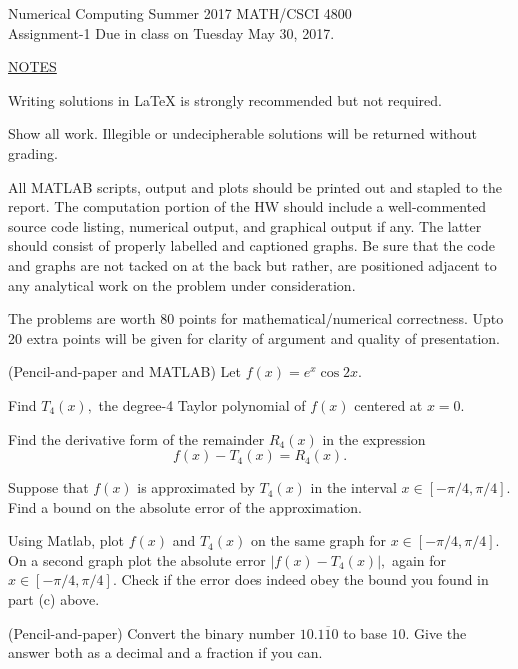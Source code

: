 % 




\bc Numerical Computing Summer 2017 \hfill MATH/CSCI 4800 \\ Assignment-1\ec
\bc Due in class on Tuesday May 30, 2017. \ec

\bigskip

\bigskip
\n\ul{NOTES}
\benum
\item Writing solutions in LaTeX is strongly recommended but not required.
\item Show all work.  Illegible or undecipherable solutions will be returned without grading.
\item All MATLAB scripts, output and plots should be printed out and stapled to the report.  The computation portion of the HW should include a well-commented source code listing, numerical output, and graphical output if any.  The latter should consist of properly labelled and captioned graphs.  Be sure that the code and graphs are not tacked on at the back but rather, are positioned adjacent to any analytical work on the problem under consideration.
\item The problems are worth 80 points for mathematical/numerical correctness.  Upto 20 extra points will be given for clarity of argument and quality of presentation.
\eenum

\bigskip
{}\ec
\benum

\item (Pencil-and-paper  and MATLAB)  Let $f(x) = e^{x}\cos {2x}.$
\benum
\item Find $T_4(x),$ the degree-4 Taylor polynomial of $f(x)$ centered at $x=0.$
\item Find the derivative form of the remainder $R_4(x)$ in the expression
\[
f(x) - T_4(x) = R_4(x).
\]
\item Suppose that $f(x)$ is approximated by $T_4(x)$ in the interval $x \in [-\pi/4,\pi/4].$  Find a bound on the absolute error of the approximation.
\item Using Matlab, plot $f(x)$ and $T_4(x)$ on the same graph for $x \in [-\pi/4,\pi/4].$
On a second graph plot the absolute error $|f(x)-T_4(x)|,$ again for $x \in [-\pi/4,\pi/4].$  Check if the error does indeed obey the bound you found in part (c) above.
\eenum

\item (Pencil-and-paper)
Convert the binary number $10.\overline{110}$ to base $10.$  Give the answer both as a decimal and a fraction if you can.


